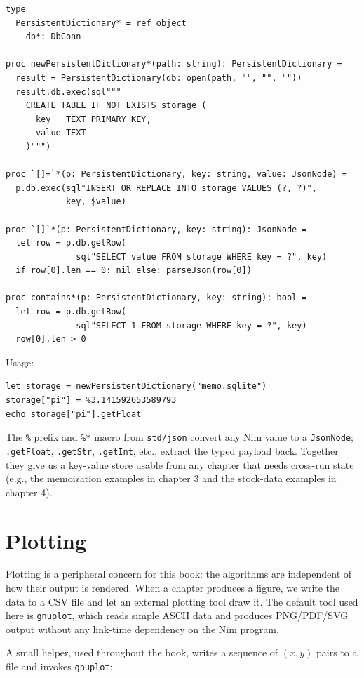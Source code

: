 \documentclass[justified, sixbynine]{tufte-book}
\def\ft{\small\tt}
\theoremstyle{plain}%
\newtheorem * {corollary}{Corollary}
\theoremstyle{definition}
\theoremstyle{remark}
\newtheorem * {remark}{Remark}
\newtheorem * {note}{Note}
\begin{document}
\begin{fullwidth}
\begin{lstlisting}[caption={in file: {\ft nlib.nim}}]
type
  PersistentDictionary* = ref object
    db*: DbConn

proc newPersistentDictionary*(path: string): PersistentDictionary =
  result = PersistentDictionary(db: open(path, "", "", ""))
  result.db.exec(sql"""
    CREATE TABLE IF NOT EXISTS storage (
      key   TEXT PRIMARY KEY,
      value TEXT
    )""")

proc `[]=`*(p: PersistentDictionary, key: string, value: JsonNode) =
  p.db.exec(sql"INSERT OR REPLACE INTO storage VALUES (?, ?)",
            key, $value)

proc `[]`*(p: PersistentDictionary, key: string): JsonNode =
  let row = p.db.getRow(
              sql"SELECT value FROM storage WHERE key = ?", key)
  if row[0].len == 0: nil else: parseJson(row[0])

proc contains*(p: PersistentDictionary, key: string): bool =
  let row = p.db.getRow(
              sql"SELECT 1 FROM storage WHERE key = ?", key)
  row[0].len > 0
\end{lstlisting}

Usage:

\begin{lstlisting}
let storage = newPersistentDictionary("memo.sqlite")
storage["pi"] = %3.141592653589793
echo storage["pi"].getFloat
\end{lstlisting}

The {\ft \%} prefix and {\ft \%*} macro from {\ft std/json} convert any Nim value to a {\ft JsonNode}; {\ft .getFloat}, {\ft .getStr}, {\ft .getInt}, etc., extract the typed payload back. Together they give us a key-value store usable from any chapter that needs cross-run state (e.g., the memoization examples in chapter 3 and the stock-data examples in chapter 4).

\goodbreak\section{Plotting}


Plotting is a peripheral concern for this book: the algorithms are independent of how their output is rendered. When a chapter produces a figure, we write the data to a CSV file and let an external plotting tool draw it. The default tool used here is {\ft gnuplot}, which reads simple ASCII data and produces PNG/PDF/SVG output without any link-time dependency on the Nim program.

A small helper, used throughout the book, writes a sequence of $(x, y)$ pairs to a file and invokes {\ft gnuplot}:


\end{fullwidth}
\end{document}

